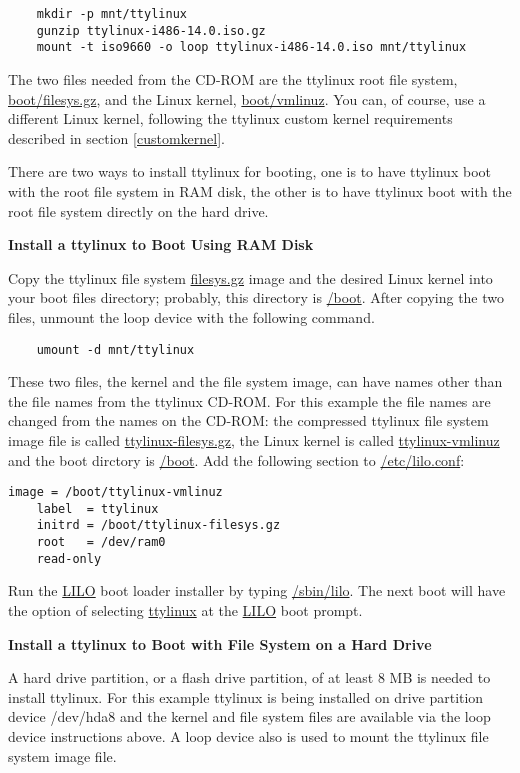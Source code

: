 \documentclass[10pt]{article}
\begin{document}
\begin{lstlisting}
	mkdir -p mnt/ttylinux
	gunzip ttylinux-i486-14.0.iso.gz
	mount -t iso9660 -o loop ttylinux-i486-14.0.iso mnt/ttylinux
\end{lstlisting}

The two files needed from the CD-ROM are the ttylinux root file system,
\url{boot/filesys.gz}, and the Linux kernel, \url{boot/vmlinuz}. You
can, of course, use a different Linux kernel, following the ttylinux custom
kernel requirements described in section \ref{customkernel}.

There are two ways to install ttylinux for booting, one is to have ttylinux
boot with the root file system in RAM disk, the other is to have ttylinux boot
with the root file system directly on the hard drive.

{\bf Install a ttylinux to Boot Using RAM Disk}

Copy the ttylinux file system \url{filesys.gz} image and the desired Linux
kernel into your boot files directory; probably, this directory is \url{/boot}.
After copying the two files, unmount the loop device with the following command.

\begin{lstlisting}
	umount -d mnt/ttylinux
\end{lstlisting}

These two files, the kernel and the file system image, can have names other
than the file names from the ttylinux CD-ROM. For this example the file names
are changed from the names on the CD-ROM: the compressed ttylinux file system
image file is called \url{ttylinux-filesys.gz}, the Linux kernel is called
\url{ttylinux-vmlinuz} and the boot dirctory is \url{/boot}. Add the following
section to \url{/etc/lilo.conf}:

\begin{lstlisting}
image = /boot/ttylinux-vmlinuz
	label  = ttylinux
	initrd = /boot/ttylinux-filesys.gz
	root   = /dev/ram0
	read-only
\end{lstlisting}

Run the \url{LILO} boot loader installer by typing \url{/sbin/lilo}. The next
boot will have the option of selecting \url{ttylinux} at the \url{LILO} boot
prompt.

{\bf Install a ttylinux to Boot with File System on a Hard Drive}

A hard drive partition, or a flash drive partition, of at least 8 MB is needed
to install ttylinux. For this example ttylinux is being installed on drive
partition device /dev/hda8 and the kernel and file system files are available
via the loop device instructions above. A loop device also is used to mount the
ttylinux file system image file.
\end{document}
